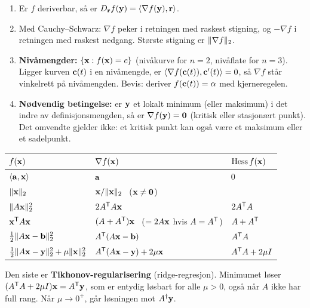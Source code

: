 \begin{teorem}
\begin{enumerate}
  \item Er $f$ deriverbar, så er $D_{\mathbf{r}}f(\mathbf{y})=\langle \nabla f(\mathbf{y}),\mathbf{r}\rangle$.
  \item Med Cauchy--Schwarz: $\nabla f$ peker i retningen med raskest stigning, og $-\nabla f$ i retningen med raskest nedgang. Største stigning er $\lVert \nabla f\rVert_2$.
  \item \textbf{Nivåmengder:} $\{\mathbf{x}:f(\mathbf{x})=c\}$ (nivåkurve for $n=2$, nivåflate for $n=3$). Ligger kurven $\mathbf{c}(t)$ i en nivåmengde, er $\langle \nabla f(\mathbf{c}(t)),\mathbf{c}'(t)\rangle=0$, så $\nabla f$ står vinkelrett på nivåmengden. Bevis: deriver $f(\mathbf{c}(t))=\alpha$ med kjerneregelen.
  \item \textbf{Nødvendig betingelse:} er $\mathbf{y}$ et lokalt minimum (eller maksimum) i det indre av definisjonsmengden, så er $\nabla f(\mathbf{y})=\mathbf{0}$ (kritisk eller stasjonært punkt). Det omvendte gjelder ikke: et kritisk punkt kan også være et maksimum eller et sadelpunkt.
\end{enumerate}
\end{teorem}

\begin{formel}
\begin{center}
\begin{tabular}{@{}lll@{}}
\toprule
$f(\mathbf{x})$ & $\nabla f(\mathbf{x})$ & $\operatorname{Hess} f(\mathbf{x})$\\
\midrule
$\langle \mathbf{a},\mathbf{x}\rangle$ & $\mathbf{a}$ & $0$\\
$\lVert \mathbf{x}\rVert_2$ & $\mathbf{x}/\lVert \mathbf{x}\rVert_2$ \ ($\mathbf{x}\neq\mathbf{0}$) & \\
$\lVert A\mathbf{x}\rVert_2^2$ & $2A^{\mathsf{T}} A\mathbf{x}$ & $2A^{\mathsf{T}} A$\\
$\mathbf{x}^{\mathsf{T}} A\mathbf{x}$ & $(A+A^{\mathsf{T}})\mathbf{x}$ \ ($=2A\mathbf{x}$ hvis $A=A^{\mathsf{T}}$) & $A+A^{\mathsf{T}}$\\
$\tfrac12\lVert A\mathbf{x}-\mathbf{b}\rVert_2^2$ & $A^{\mathsf{T}}(A\mathbf{x}-\mathbf{b})$ & $A^{\mathsf{T}} A$\\
$\tfrac12\lVert A\mathbf{x}-\mathbf{y}\rVert_2^2+\mu\lVert \mathbf{x}\rVert_2^2$ & $A^{\mathsf{T}}(A\mathbf{x}-\mathbf{y})+2\mu\mathbf{x}$ & $A^{\mathsf{T}} A+2\mu I$\\
\bottomrule
\end{tabular}
\end{center}
Den siste er \textbf{Tikhonov-regularisering} (ridge-regresjon). Minimumet løser $(A^{\mathsf{T}} A+2\mu I)\mathbf{x}=A^{\mathsf{T}}\mathbf{y}$, som er entydig løsbart for alle $\mu>0$, også når $A$ ikke har full rang. Når $\mu\to0^+$, går løsningen mot $A^\dagger\mathbf{y}$.
\end{formel}

